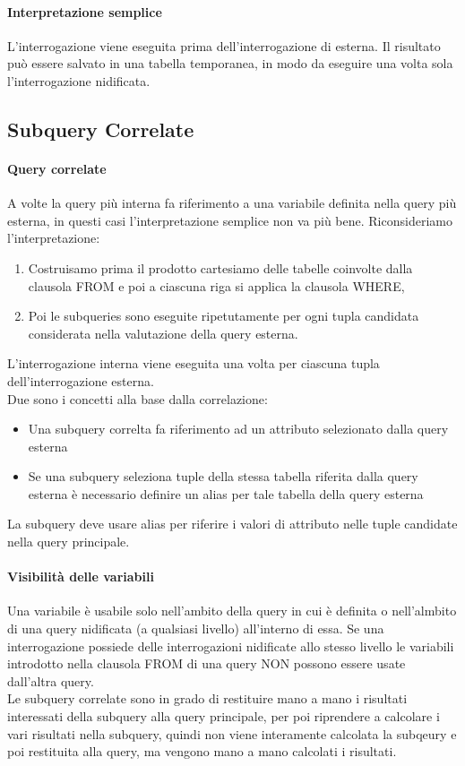 \paragraph*{Interpretazione semplice} L'interrogazione viene eseguita prima dell'interrogazione
di esterna. Il risultato può essere salvato in una tabella temporanea, in modo da eseguire una volta 
sola l'interrogazione nidificata.
\subsection{Subquery Correlate}
\paragraph*{Query correlate} A volte la query più interna fa riferimento a una
variabile definita nella query più esterna, in questi casi l'interpretazione semplice non va
più bene. Riconsideriamo l'interpretazione:
\begin{enumerate}
  \item Costruisamo prima il prodotto cartesiamo delle tabelle coinvolte dalla clausola FROM e
  poi a ciascuna riga si applica la clausola WHERE,
  \item Poi le subqueries sono eseguite ripetutamente per ogni tupla candidata considerata
  nella valutazione della query esterna.
\end{enumerate}
L'interrogazione interna viene eseguita una volta per ciascuna tupla dell'interrogazione esterna.\\
Due sono i concetti alla base dalla correlazione:
\begin{itemize}
  \item Una subquery correlta fa riferimento ad un attributo selezionato dalla query esterna
  \item Se una subquery seleziona tuple della stessa tabella riferita dalla query esterna è necessario
  definire un alias per tale tabella della query esterna
\end{itemize}
La subquery deve usare alias per riferire i valori di attributo nelle tuple candidate nella query
principale.
\paragraph*{Visibilità delle variabili} Una variabile è usabile solo nell'ambito della query
in cui è definita o nell'almbito di una query nidificata (a qualsiasi livello) all'interno di essa.
Se una interrogazione possiede delle interrogazioni nidificate allo stesso livello
le variabili introdotto nella clausola FROM di una query NON possono essere usate
dall'altra query.\\
Le subquery correlate sono in grado di restituire mano a mano i risultati interessati
della subquery alla query principale, per poi riprendere a calcolare i vari risultati nella
subquery, quindi non viene interamente calcolata la subqeury e poi restituita alla query, ma vengono
mano a mano calcolati i risultati.
